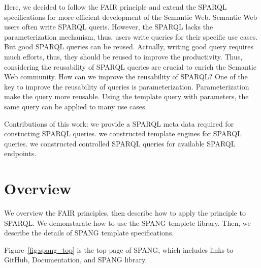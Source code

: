 \documentclass[runningheads]{llncs}
\begin{document}
Here, we decided to follow the FAIR principle and extend the SPARQL specifications for more efficient development of the Semantic Web.
Semantic Web users often write SPARQL queris.
However, the SPARQL lacks the parameterization mechanism, thus, users write queries for their specific use cases.
But good SPARQL queries can be reused.
Actually, writing good query requires much efforts, thus, they should be reused to improve the productivity.
Thus, considering the reusability of SPARQL queries are crucial to enrich the Semantic Web community.
How can we improve the reusability of SPARQL?
One of the key to improve the reusability of queries is parameterization.
Parameterization make the query more reusable.
Using the template query with parameters, the same query can be applied to many use cases.

Contributions of this work:
we provide a SPARQL meta data required for constucting SPARQL queries.
we constructed template engines for SPARQL queries.
we constructed controlled SPARQL queries for available SPARQL endpoints.




\section{Overview}

We overview the FAIR principles, then describe how to apply the principle to SPARQL.
We demonstarate how to use the SPANG templete library.
Then, we describe the details of SPANG template specifications.


Figure~\ref{fig:spang_top} is the top page of SPANG, which includes links to GitHub, Documentation, and SPANG library.
\end{document}
